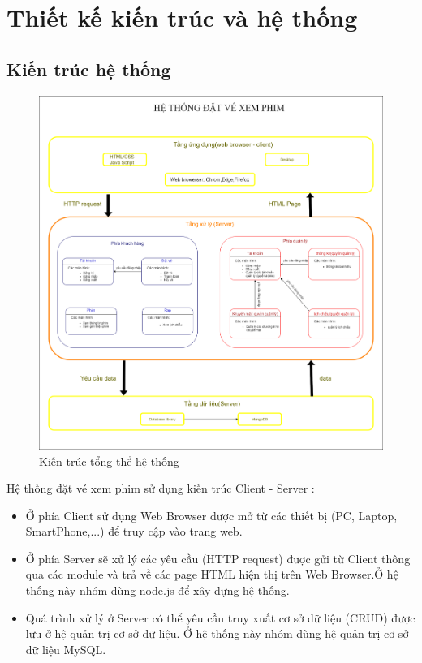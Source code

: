 \documentclass[a4paper, 12pt]{article}
\begin{document}
	\section{Thiết kế kiến trúc và hệ thống}
	
	\subsection{Kiến trúc hệ thống}
	\begin{figure}[H]
		\begin{center}
			\includegraphics[scale = 0.25]{image/4.1.png}
			\caption{Kiến trúc tổng thể hệ thống}
		\end{center}
	\end{figure}
	Hệ thống đặt vé xem phim sử dụng kiến trúc Client - Server :
	\begin{itemize}
		\item Ở phía Client sử dụng Web Browser được mở từ các thiết bị (PC, Laptop, SmartPhone,...) để truy cập vào trang web.
		\item Ở phía Server sẽ xử lý các yêu cầu (HTTP request) được gửi từ Client thông qua các module và trả về các page HTML hiện thị trên Web Browser.Ở hệ thống này nhóm dùng node.js để xây dựng hệ thống.
		\item Quá trình xử lý ở Server có thể yêu cầu truy xuất cơ sở dữ liệu (CRUD) được lưu ở hệ quản trị cơ sở dữ liệu. Ở hệ thống này nhóm dùng hệ quản trị cơ sở dữ liệu MySQL.
	\end{itemize}
	
\end{document}
